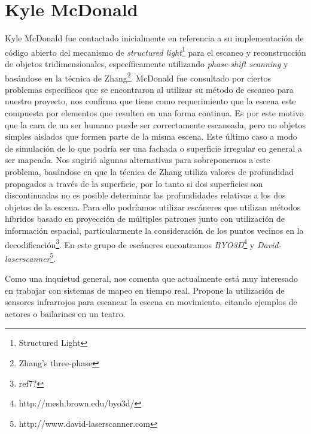 \section{Kyle McDonald}
Kyle McDonald\cite{KyleMcDonald} fue contactado inicialmente en referencia a su implementación de código abierto del mecanismo de \emph{structured light}\footnote{Structured Light} para el escaneo y reconstrucción de objetos tridimensionales, específicamente utilizando \emph{phase-shift scanning} y basándose en la técnica de Zhang\footnote{Zhang's three-phase}. McDonald fue consultado por ciertos problemas específicos  que se encontraron al utilizar su método de escaneo para nuestro proyecto, nos confirma que tiene como requerimiento que la escena este compuesta por elementos que resulten en una forma continua. Es por este motivo que la cara de un ser humano puede ser correctamente escaneada, pero no objetos simples aislados que formen parte de la misma escena. Este último caso a modo de simulación de lo que podría ser una fachada o superficie irregular en general a ser mapeada. Nos sugirió algunas alternativas para sobreponernos a este problema, basándose en que la técnica de Zhang utiliza valores de profundidad propagados a través de la superficie, por lo tanto si dos superficies son discontinuadas no es posible determinar las profundidades relativas a los dos objetos de la escena. Para ello podríamos utilizar escáneres que utilizan métodos híbridos basado en proyección de múltiples patrones junto con utilización de información espacial, particularmente la consideración de los puntos vecinos en la decodificación\footnote{ref7?}. En este grupo de escáneres encontramos \emph{BYO3D}\footnote{http://mesh.brown.edu/byo3d/} y \emph{David-laserscanner}\footnote{http://www.david-laserscanner.com}.

Como una inquietud general, nos comenta que actualmente está muy interesado en trabajar con sistemas de mapeo en tiempo real. Propone la utilización de sensores infrarrojos para escanear la escena en movimiento, citando ejemplos de actores o bailarines en un teatro.